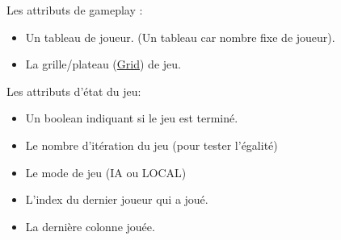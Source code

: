 \documentclass[11pt]{article}
\begin{document}
Les attributs de gameplay :\\
\begin{itemize}
\item Un tableau de joueur. (Un tableau car nombre fixe de joueur).\\
\item La grille/plateau (\hyperref[orgc79ccc3]{Grid}) de jeu.\\
\end{itemize}

Les attributs d'état du jeu:\\
\begin{itemize}
\item Un boolean indiquant si le jeu est terminé.\\
\item Le nombre d'itération du jeu (pour tester l'égalité)\\
\item Le mode de jeu (IA ou LOCAL)\\
\item L'index du dernier joueur qui a joué.\\
\item La dernière colonne jouée.\\
\end{itemize}
\end{document}
